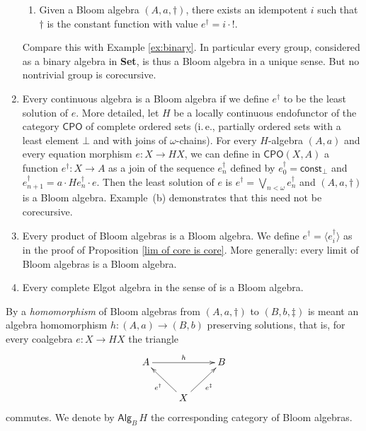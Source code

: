\documentclass{LMCS}
\theoremstyle{plain}
\theoremstyle{definition}
\numberwithin{equation}{section}
\begin{document}
\begin{exa}
\begin{enumerate}[label=\({\alph*}]
\begin{enumerate}[label=(\arabic*)]
    \item Given a Bloom algebra $(A,a,\dagger)$, there exists an idempotent $i$ such that $\dagger$ is the constant function with value $e^\dagger=i\cdot !$.
    \end{enumerate}
    Compare this with Example \ref{ex:binary}. In particular every group, considered as a binary algebra in {\bf Set}, is thus a Bloom algebra in a unique sense. But no nontrivial group is corecursive.

  \item Every continuous algebra is a Bloom algebra if we define
    $e^\dagger$ to be the least solution of $e$. More detailed, let
    $H$ be a locally continuous endofunctor of the category
    $\mathsf{CPO}$ of complete ordered sets (i.\,e., partially ordered
    sets with a least element $\bot$ and with joins of
    $\omega$-chains). For every $H$-algebra $(A,a)$ and every equation
    morphism $e:X\rightarrow HX$, we can define in $\mathsf{CPO}(X,A)$
    a function $e^\dagger :X\rightarrow A$ as a join of the sequence
    $e_n^\dagger$ defined by $e_0^\dagger=\mathsf{const}_\bot$ and
    $e^\dagger_{n+1}=a\cdot He^\dagger_n\cdot e$. Then the least
    solution of $e$ is $e^\dagger =\bigvee_{n<\omega} e_n^\dagger$ and
    $(A,a,\dagger)$ is a Bloom algebra. Example~(b) demonstrates that
    this need not be corecursive.

  \item Every product of Bloom algebras is a Bloom algebra. We define $e^\dagger =\langle e_i^\dagger \rangle$ as in the proof of Proposition \ref{lim of core is core}. More generally: every limit of Bloom algebras is a Bloom algebra.

  \item Every complete Elgot algebra in the sense of
    \cite{amv_classes} is a Bloom algebra.
  \end{enumerate}
\end{exa}

\begin{defi}\label{preserv solu}
By a {\it homomorphism} of Bloom algebras from $(A,a,\dagger)$ to $(B,b,\ddag)$ is meant an algebra homomorphism $h:(A,a)\rightarrow (B,b)$ preserving solutions, that is, for every coalgebra $e:X\rightarrow HX$ the triangle
$$
\xymatrix{
A\ar[rr]^{h}&&B\\
&X\ar[ur]_{e^\ddag}\ar[ul]^{e^\dag}
}
$$
commutes. We denote by $\mathsf{Alg}_B\, H$ the corresponding category of Bloom algebras.
\end{defi}
\end{document}
